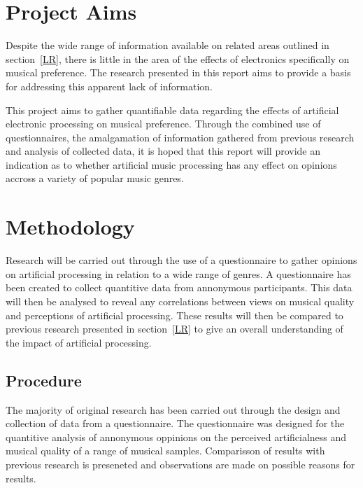 \documentclass[titlepage]{scrartcl}
\begin{document}
    \section{Project Aims}
    Despite the wide range of information available on related areas outlined
    in section~\ref{LR}, there is little in the area of the effects of
    electronics specifically on musical preference. The research presented in
    this report aims to provide a basis for addressing this apparent lack of
    information.

    This project aims to gather quantifiable data regarding the effects of
    artificial electronic processing on musical preference. Through the
    combined use of questionnaires, the amalgamation of information gathered
    from previous research and analysis of collected data, it is hoped that
    this report will provide an indication as to whether artificial music
    processing has any effect on opinions accross a variety of popular music
    genres. 

    \section{Methodology}
    Research will be carried out through the use of a questionnaire to gather
    opinions on artificial processing in relation to a wide range of genres.
    A questionnaire has been created to collect quantitive data from annonymous
    participants. This data will then be analysed to reveal any correlations
    between views on musical quality and perceptions of artificial processing.
    These results will then be compared to previous research presented in
    section~\ref{LR} to give an overall understanding of the impact of
    artificial processing.

    \subsection{Procedure}
    The majority of original research has been carried out through the design and
    collection of data from a questionnaire. The questionnaire was designed for
    the quantitive analysis of annonymous oppinions on the perceived
    artificialness and musical quality of a range of musical samples.
    Comparisson of results with previous research is preseneted and
    observations are made on possible reasons for results.
\end{document}
